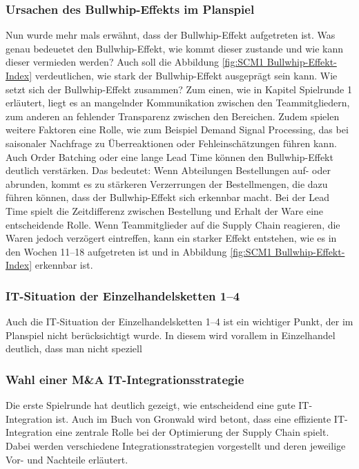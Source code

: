 \documentclass[a4paper,12pt]{article}
\begin{document}
\subsubsection{Ursachen des Bullwhip-Effekts im Planspiel}
Nun wurde mehr mals erwähnt, dass der Bullwhip-Effekt aufgetreten ist.
Was genau bedeuetet den Bullwhip-Effekt, wie kommt dieser zustande und wie kann dieser vermieden werden?
Auch soll die Abbildung \ref{fig:SCM1 Bullwhip-Effekt-Index} verdeutlichen, wie stark der Bullwhip-Effekt ausgeprägt sein kann.
Wie setzt sich der Bullwhip-Effekt zusammen? Zum einen, wie in Kapitel Spielrunde 1 erläutert, liegt es an mangelnder Kommunikation zwischen den Teammitgliedern,
 zum anderen an fehlender Transparenz zwischen den Bereichen.
Zudem spielen weitere Faktoren eine Rolle, wie zum Beispiel Demand Signal Processing, das bei saisonaler Nachfrage zu Überreaktionen oder Fehleinschätzungen führen kann.
Auch Order Batching oder eine lange Lead Time können den Bullwhip-Effekt deutlich verstärken.
Das bedeutet: Wenn Abteilungen Bestellungen auf- oder abrunden, kommt es zu stärkeren Verzerrungen der Bestellmengen, die dazu führen können, dass der Bullwhip-Effekt sich erkennbar macht.
Bei der Lead Time spielt die Zeitdifferenz zwischen Bestellung und Erhalt der Ware eine entscheidende Rolle.
Wenn Teammitglieder auf die Supply Chain reagieren, die Waren jedoch verzögert eintreffen, kann ein starker Effekt entstehen, wie es in den Wochen 11–18 aufgetreten ist und in Abbildung \ref{fig:SCM1 Bullwhip-Effekt-Index} erkennbar ist.

\subsubsection{IT-Situation der Einzelhandelsketten 1–4}
Auch die IT-Situation der Einzelhandelsketten 1–4 ist ein wichtiger Punkt, der im Planspiel nicht berücksichtigt wurde.
In diesem wird vorallem in Einzelhandel deutlich, dass man nicht speziell 

\subsubsection{Wahl einer M\&A IT-Integrationsstrategie}
Die erste Spielrunde hat deutlich gezeigt, wie entscheidend eine gute IT-Integration ist.
Auch im Buch von Gronwald wird betont, dass eine effiziente IT-Integration eine zentrale Rolle bei der Optimierung der Supply Chain spielt.
Dabei werden verschiedene Integrationsstrategien vorgestellt und deren jeweilige Vor- und Nachteile erläutert.
\end{document}

